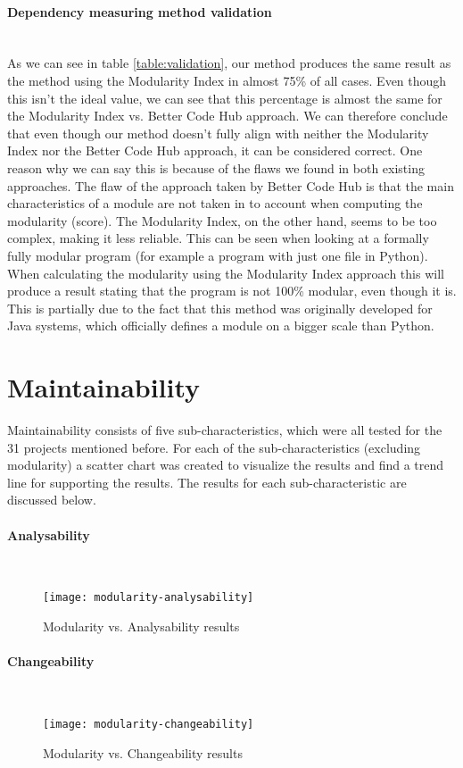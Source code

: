 \documentclass[twoside]{uva-inf-bachelor-thesis}
\newcommand{\myparagraph}[1]{\paragraph{#1}\mbox{}\\}
\begin{document}
\myparagraph{Dependency measuring method validation}
As we can see in table \ref{table:validation}, our method produces the same result as the method using the Modularity Index in almost 75\% of all cases. Even though this isn't the ideal value, we can see that this percentage is almost the same for the Modularity Index vs. Better Code Hub approach. We can therefore conclude that even though our method doesn't fully align with neither the Modularity Index nor the Better Code Hub approach, it can be considered correct. One reason why we can say this is because of the flaws we found in both existing approaches. The flaw of the approach taken by Better Code Hub is that the main characteristics of a module are not taken in to account when computing the modularity (score). The Modularity Index, on the other hand, seems to be too complex, making it less reliable. This can be seen when looking at a formally fully modular program (for example a program with just one file in Python). When calculating the modularity using the Modularity Index approach this will produce a result stating that the program is not 100\% modular, even though it is. This is partially due to the fact that this method was originally developed for Java systems, which officially defines a module on a bigger scale than Python.

\section{Maintainability}
Maintainability consists of five sub-characteristics, which were all tested for the 31 projects mentioned before. For each of the sub-characteristics (excluding modularity) a scatter chart was created to visualize the results and find a trend line for supporting the results. The results for each sub-characteristic are discussed below.

\myparagraph{Analysability}
\begin{figure}[H]
    \caption{Modularity vs. Analysability results}
    \centering
        \texttt{[image: modularity-analysability]}
\end{figure}

\myparagraph{Changeability}
\begin{figure}[H]
    \caption{Modularity vs. Changeability results}
    \centering
        \texttt{[image: modularity-changeability]}
\end{figure}
\end{document}
